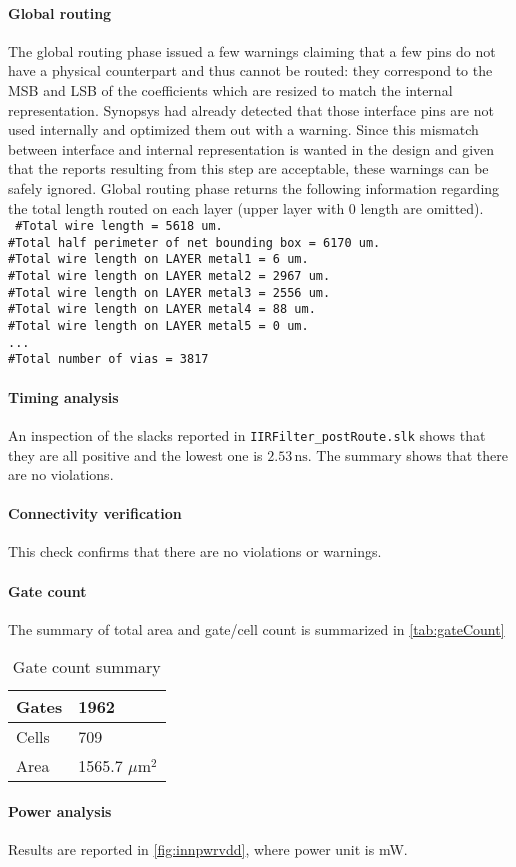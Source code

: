 \paragraph{Global routing} The global routing phase issued a few warnings claiming that a few pins do not have a physical counterpart and thus cannot be routed: they correspond to the MSB and LSB of the coefficients which are resized to match the internal representation. Synopsys had already detected that those interface pins are not used internally and optimized them out with a warning. Since this mismatch between interface and internal representation is wanted in the design and given that the reports resulting from this step are acceptable, these warnings can be safely ignored.
Global routing phase returns the following information regarding the total length routed on each layer (upper layer with 0 length are omitted).\\
\texttt{
\#Total wire length = 5618 um.\\
\#Total half perimeter of net bounding box = 6170 um.\\
\#Total wire length on LAYER metal1 = 6 um.\\
\#Total wire length on LAYER metal2 = 2967 um.\\
\#Total wire length on LAYER metal3 = 2556 um.\\
\#Total wire length on LAYER metal4 = 88 um.\\
\#Total wire length on LAYER metal5 = 0 um.\\
...\\
\#Total number of vias = 3817\\
}


\paragraph{Timing analysis} An inspection of the slacks reported in \texttt{IIRFilter\_postRoute.slk} shows that they are all positive and the lowest one is $2.53\,\textrm{ns}$. The summary shows that there are no violations.

\paragraph{Connectivity verification} This check confirms that there are no violations or warnings.

\paragraph{Gate count} The summary of total area and gate/cell count is summarized in \autoref{tab:gateCount}
\begin{table}
	\centering
\begin{tabular}{|l|l|}
	\hline
Gates &1962\\\hline
 Cells &     709\\\hline
  Area &    1565.7 $\mu\textrm{m}^2$\\\hline
\end{tabular}
\caption{Gate count summary}
\label{tab:gateCount}
\end{table}

\paragraph{Power analysis} Results are reported in \autoref{fig:innpwrvdd}, where power unit is mW.



